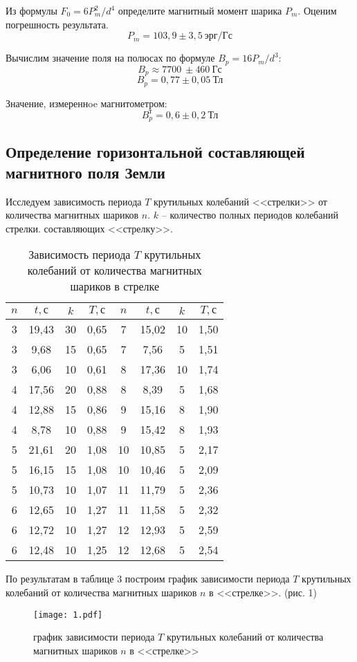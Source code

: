 Из формулы $F_0 = 6P_m^2/d^4$ определите магнитный момент шарика $P_m$. Оценим погрешность результата.
\[ P_m = 103,9 \pm 3,5  \ \text{эрг}/\text{Гс}\]

Вычислим значение поля на полюсах по формуле $B_p = 16P_m/d^3$:
\[ B_p \approx  7700\ \pm 460\ \text{Гс} \]
\[ B_p = 0,77 \pm 0,05\ \text {Тл}\]

Значение, измереннoe магнитометром:
\[ B_p^\text{т} = 0,6 \pm 0,2\ \text{Тл}\]

\subsection*{Определение горизонтальной составляющей магнитного поля Земли}
Исследуем зависимость периода $T$ крутильных колебаний <<стрелки>> от количества магнитных
шариков $n$. $k$ -- количество полных периодов колебаний стрелки.
составляющих <<стрелку>>. 
\renewcommand{\arraystretch}{1.2} 
\begin{table}[H]
\centering
\begin{tabular}{|c|c|c|c||c|c|c|c|}
\hline
$n$  & $t, \text{с}$     & $k$  & $T, \text{с}$ & $n$  & $t, \text{с}$     & $k$  & $T, \text{с}$    \\ \hline
3 & 19,43 & 30 & 0,65 & 7  & 15,02 & 10 & 1,50 \\ \hline
3 & 9,68  & 15 & 0,65 & 7  & 7,56  & 5  & 1,51 \\ \hline
3 & 6,06  & 10 & 0,61 & 8  & 17,36 & 10 & 1,74 \\ \hline
4 & 17,56 & 20 & 0,88 & 8  & 8,39  & 5  & 1,68 \\ \hline
4 & 12,88 & 15 & 0,86 & 9  & 15,16 & 8  & 1,90 \\ \hline
4 & 8,78  & 10 & 0,88 & 9  & 15,42 & 8  & 1,93 \\ \hline
5 & 21,61 & 20 & 1,08 & 10 & 10,85 & 5  & 2,17 \\ \hline
5 & 16,15 & 15 & 1,08 & 10 & 10,46 & 5  & 2,09 \\ \hline
5 & 10,73 & 10 & 1,07 & 11 & 11,79 & 5  & 2,36 \\ \hline
6 & 12,65 & 10 & 1,27 & 11 & 11,58 & 5  & 2,32 \\ \hline
6 & 12,72 & 10 & 1,27 & 12 & 12,93 & 5  & 2,59 \\ \hline
6 & 12,48 & 10 & 1,25 & 12 & 12,68 & 5  & 2,54 \\ \hline
\end{tabular}
\captionsetup{justification=centering}
\caption{Зависимость периода $T$ крутильных колебаний от количества магнитных шариков в стрелке}
\end{table}
По результатам в таблице 3 построим график зависимости периода $T$ крутильных колебаний от
количества магнитных шариков $n$ в <<стрелке>>. (рис. 1)
\begin{figure}[H]
    \centering
    \texttt{[image: 1.pdf]}
    \captionsetup{justification=centering}
    \caption{график зависимости периода $T$ крутильных колебаний от
    количества магнитных шариков $n$ в <<стрелке>>}
\end{figure}

